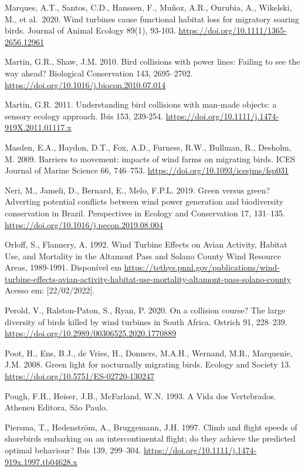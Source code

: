 \documentclass[
  oneside]{scrbook}
\begin{document}
Marques, A.T., Santos, C.D., Hanssen, F., Muñoz, A.R., Onrubia, A., Wikelski, M., et al.~2020. Wind turbines cause functional habitat loss for migratory soaring birds. Journal of Animal Ecology 89(1), 93-103. \url{https://doi.org/10.1111/1365-2656.12961}

Martin, G.R., Shaw, J.M. 2010. Bird collisions with power lines: Failing to see the way ahead? Biological Conservation 143, 2695--2702. \url{https://doi.org/10.1016/j.biocon.2010.07.014}

Martin, G.R. 2011. Understanding bird collisions with man-made objects: a sensory ecology approach. Ibis 153, 239-254. \url{https://doi.org/10.1111/j.1474-919X.2011.01117.x}

Masden, E.A., Haydon, D.T., Fox, A.D., Furness, R.W., Bullman, R., Desholm, M. 2009. Barriers to movement: impacts of wind farms on migrating birds. ICES Journal of Marine Science 66, 746--753. \url{https://doi.org/10.1093/icesjms/fsp031}

Neri, M., Jameli, D., Bernard, E., Melo, F.P.L. 2019. Green versus green? Adverting potential conflicts between wind power generation and biodiversity conservation in Brazil. Perspectives in Ecology and Conservation 17, 131--135. \url{https://doi.org/10.1016/j.pecon.2019.08.004}

Orloff, S., Flannery, A. 1992. Wind Turbine Effects on Avian Activity, Habitat Use, and Mortality in the Altamont Pass and Solano County Wind Resource Areas, 1989-1991. Disponível em \url{https://tethys.pnnl.gov/publications/wind-turbine-effects-avian-activity-habitat-use-mortality-altamont-pass-solano-county} Acesso em: {[}22/02/2022{]}.

Perold, V., Ralston-Paton, S., Ryan, P. 2020. On a collision course? The large diversity of birds killed by wind turbines in South Africa. Ostrich 91, 228--239. \url{https://doi.org/10.2989/00306525.2020.1770889}

Poot, H., Ens, B.J., de Vries, H., Donners, M.A.H., Wernand, M.R., Marquenie, J.M. 2008. Green light for nocturnally migrating birds. Ecology and Society 13. \url{https://doi.org/10.5751/ES-02720-130247}

Pough, F.H., Heiser, J.B., McFarland, W.N. 1993. A Vida dos Vertebrados. Atheneu Editora, São Paulo.

Piersma, T., Hedenström, A., Bruggemann, J.H. 1997. Climb and flight speeds of shorebirds embarking on an intercontinental flight; do they achieve the predicted optimal behaviour? Ibis 139, 299--304. \url{https://doi.org/10.1111/j.1474-919x.1997.tb04628.x}
\end{document}
